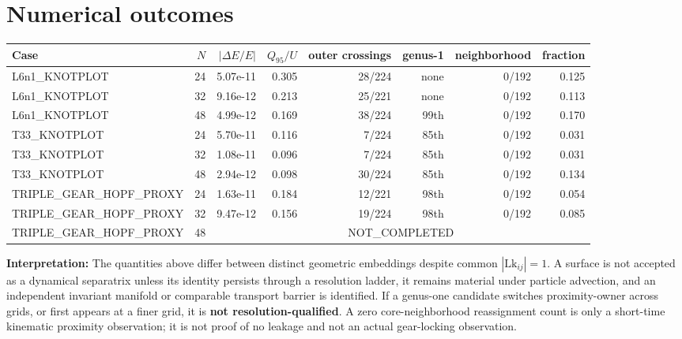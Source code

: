 \documentclass[10pt,a4paper]{article}
\begin{document}
\section{Numerical outcomes}
\begin{center}\footnotesize
\begin{tabular}{lrrrrrrr}\toprule
Case & $N$ & $|\Delta E/E|$ & $Q_{95}/U$ & outer crossings & genus-1 & neighborhood & fraction\\\midrule
L6n1\_KNOTPLOT & 24 & 5.07e-11 & 0.305 & 28/224 & none & 0/192 & 0.125 \\
L6n1\_KNOTPLOT & 32 & 9.16e-12 & 0.213 & 25/221 & none & 0/192 & 0.113 \\
L6n1\_KNOTPLOT & 48 & 4.99e-12 & 0.169 & 38/224 & 99th & 0/192 & 0.170 \\
T33\_KNOTPLOT & 24 & 5.70e-11 & 0.116 & 7/224 & 85th & 0/192 & 0.031 \\
T33\_KNOTPLOT & 32 & 1.08e-11 & 0.096 & 7/224 & 85th & 0/192 & 0.031 \\
T33\_KNOTPLOT & 48 & 2.94e-12 & 0.098 & 30/224 & 85th & 0/192 & 0.134 \\
TRIPLE\_GEAR\_HOPF\_PROXY & 24 & 1.63e-11 & 0.184 & 12/221 & 98th & 0/192 & 0.054 \\
TRIPLE\_GEAR\_HOPF\_PROXY & 32 & 9.47e-12 & 0.156 & 19/224 & 98th & 0/192 & 0.085 \\
TRIPLE\_GEAR\_HOPF\_PROXY & 48 & \multicolumn{6}{c}{\textsf{NOT\_COMPLETED}} \\
\bottomrule
\end{tabular}\end{center}
\textbf{Interpretation:} The quantities above differ between distinct geometric embeddings despite common
$|\mathrm{Lk}_{ij}|=1$. A surface is not accepted as a dynamical separatrix unless
its identity persists through a resolution ladder, it remains material under particle advection, and an independent
invariant manifold or comparable transport barrier is identified.
If a genus-one candidate switches proximity-owner across grids, or first appears at a finer grid, it is
\textbf{not resolution-qualified}. A zero core-neighborhood reassignment count is only a short-time kinematic
proximity observation; it is not proof of no leakage and not an actual gear-locking observation.
\end{document}
